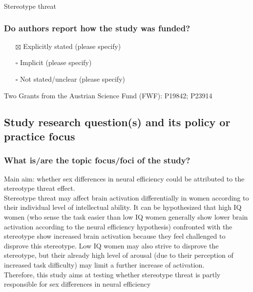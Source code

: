 \documentclass[
  doc, a4paper]{apa7}
\providecommand{\tightlist}{%
  \setlength{\itemsep}{0pt}\setlength{\parskip}{0pt}}
\begin{document}
Stereotype threat

\subsubsection{Do authors report how the study was funded?}\label{do-authors-report-how-the-study-was-funded}

\begin{itemize}
\tightlist
\item[$\boxtimes$]
  Explicitly stated (please specify)\\
\item[$\square$]
  Implicit (please specify)\\
\item[$\square$]
  Not stated/unclear (please specify)
\end{itemize}

Two Grants from the Austrian Science Fund (FWF): P19842; P23914

\subsection{Study research question(s) and its policy or practice focus}\label{study-research-questions-and-its-policy-or-practice-focus}

\subsubsection{What is/are the topic focus/foci of the study?}\label{what-isare-the-topic-focusfoci-of-the-study}

Main aim: whether sex differences in neural efficiency could be attributed to the stereotype threat effect.\\
Stereotype threat may affect brain activation differentially in women according to their individual level of intellectual ability. It can be hypothesized that high IQ women (who sense the task easier than low IQ women generally show lower brain activation according to the neural efficiency hypothesis) confronted with the stereotype show increased brain activation because they feel challenged to disprove this stereotype. Low IQ women may also strive to disprove the stereotype, but their already high level of arousal (due to their perception of increased task difficulty) may limit a further increase of activation.\\
Therefore, this study aims at testing whether stereotype threat is partly responsible for sex differences in neural efficiency
\end{document}
